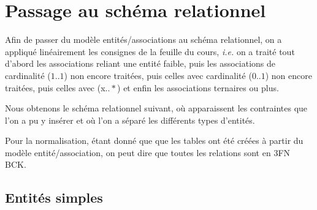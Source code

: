 \documentclass[10pt]{article}
\begin{document}
\section{Passage au schéma relationnel}

Afin de passer du modèle entités/associations au schéma relationnel, on a appliqué linéairement les consignes de la feuille du cours,
\emph{i.e.} on a traité tout d'abord les associations reliant une entité faible, puis les associations de cardinalité ($1..1$) non encore
traitées, puis celles avec cardinalité ($0..1$) non encore traitées, puis celles avec (x$..*$) et enfin les associations ternaires ou plus.

Nous obtenons le schéma relationnel suivant, où apparaissent les contraintes que l'on a pu y insérer et où l'on a séparé les différents
types d'entités.

Pour la normalisation, étant donné que que les tables ont été créées à partir du modèle entité/association, on peut dire que
toutes les relations sont en 3FN BCK.

\subsection{Entités simples}
\end{document}
